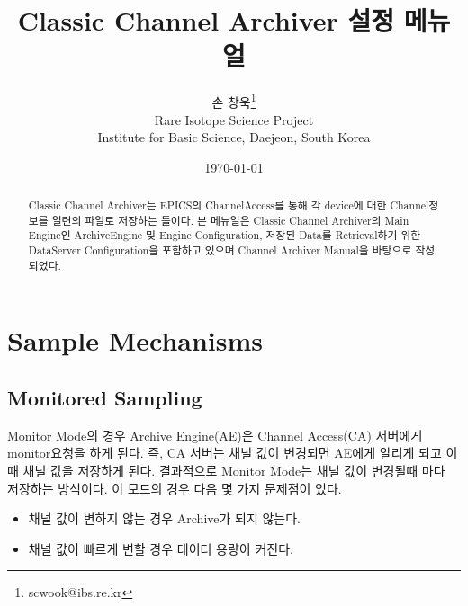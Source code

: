 \documentclass[11pt
  , a4paper
  , article
  , oneside
]{memoir}
\begin{document}
\newcommand{\technumber}{
  RAON Control-Document Series\\
  Revision : v1.0,   Release : June 24, 2014}
\title{\textbf{Classic Channel Archiver 설정 메뉴얼}}

\author{손 창욱\thanks{scwook@ibs.re.kr} \\

  Rare Isotope Science Project\\
  Institute for Basic Science, Daejeon, South Korea
}
\date{\today}

\renewcommand{\maketitlehooka}{\begin{flushright}\textsf{\technumber}\end{flushright}}

\maketitle

\begin{abstract}
Classic Channel Archiver는 EPICS의 ChannelAccess를 통해 각 device에 대한 Channel정보를
일련의 파일로 저장하는 툴이다. 본 메뉴얼은 Classic Channel Archiver의 Main Engine인 ArchiveEngine 및 
Engine Configuration, 저장된 Data를 Retrieval하기 위한 DataServer Configuration을 포함하고 있으며
Channel Archiver Manual\citep{CA_MANUAL}을 바탕으로 작성되었다.
\end{abstract}

\chapter{Sample Mechanisms}
\section{Monitored Sampling}
Monitor Mode의 경우 Archive Engine(AE)은 Channel Access(CA) 서버에게 monitor요청을 하게 된다.
즉, CA 서버는 채널 값이 변경되면 AE에게 알리게 되고 이 때 채널 값을 저장하게 된다. 결과적으로
Monitor Mode는 채널 값이 변경될때 마다 저장하는 방식이다. 이 모드의 경우 다음 몇 가지 문제점이
있다.
\begin{itemize}
\item 채널 값이 변하지 않는 경우 Archive가 되지 않는다. 
\item 채널 값이 빠르게 변할 경우 데이터 용량이 커진다.
\end{itemize} 
\end{document}
